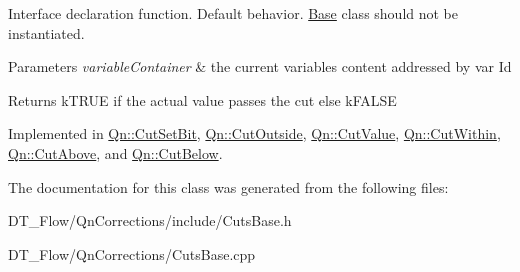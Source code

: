 Interface declaration function. Default behavior. \mbox{\hyperlink{classBase}{Base}} class should not be instantiated.


\begin{DoxyParams}{Parameters}
{\em variable\+Container} & the current variables content addressed by var Id \\
\hline
\end{DoxyParams}
\begin{DoxyReturn}{Returns}
k\+T\+R\+UE if the actual value passes the cut else k\+F\+A\+L\+SE 
\end{DoxyReturn}


Implemented in \mbox{\hyperlink{classQn_1_1CutSetBit_a8881f7abf183ff353492a3c96862081e}{Qn\+::\+Cut\+Set\+Bit}}, \mbox{\hyperlink{classQn_1_1CutOutside_ad368fe06c6b6228edbef319e73f63e24}{Qn\+::\+Cut\+Outside}}, \mbox{\hyperlink{classQn_1_1CutValue_acdfa89e7784423f4beaea51deafd424f}{Qn\+::\+Cut\+Value}}, \mbox{\hyperlink{classQn_1_1CutWithin_a0766a4ec99389a9991ee8f2c974bdaf4}{Qn\+::\+Cut\+Within}}, \mbox{\hyperlink{classQn_1_1CutAbove_a2d7ecca87d2d0c50724d795715f5cedd}{Qn\+::\+Cut\+Above}}, and \mbox{\hyperlink{classQn_1_1CutBelow_ae7ea2216ffcf3e65c0dd89b04ff9bf21}{Qn\+::\+Cut\+Below}}.



The documentation for this class was generated from the following files\+:\begin{DoxyCompactItemize}
\item 
D\+T\+\_\+\+Flow/\+Qn\+Corrections/include/Cuts\+Base.\+h\item 
D\+T\+\_\+\+Flow/\+Qn\+Corrections/Cuts\+Base.\+cpp\end{DoxyCompactItemize}
